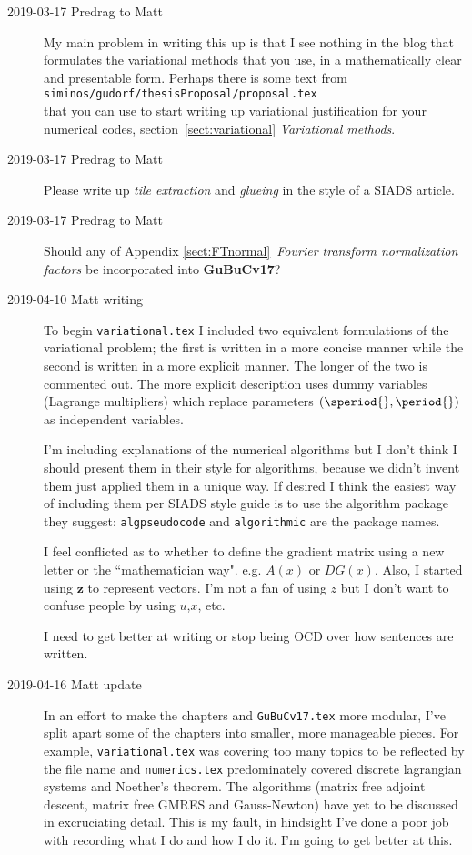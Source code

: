 \begin{description}

\item[2019-03-17 Predrag to Matt]
My main problem in writing this up is that I see nothing in
the blog that formulates the variational methods that you use,
in a mathematically clear and presentable form.
Perhaps there is some text from\\
\texttt{siminos/gudorf/thesisProposal/proposal.tex}\\
that you can use to start writing up variational justification for
your numerical codes, section~\ref{sect:variational} {\em Variational methods}.

\item[2019-03-17 Predrag to Matt]
Please write up {\em tile extraction} and {\em glueing} in the style of a
SIADS article.


\item[2019-03-17 Predrag to Matt]
Should any of
Appendix \ref{sect:FTnormal}~{\em Fourier transform normalization factors}
be incorporated into {\bf GuBuCv17}?

\item[2019-04-10 Matt writing]
To begin \texttt{variational.tex} I included two equivalent formulations
of the variational problem; the first is written in a more concise manner
while the second is written in a more explicit manner. The longer of the
two is commented out. The more explicit description uses dummy variables
(Lagrange multipliers) which replace parameters $(\speriod{},\period{})$
as independent variables.

I'm including explanations of the numerical algorithms but I don't think
I should present them in their style for algorithms, because we didn't
invent them just applied them in a unique way. If desired I think the
easiest way of including them per SIADS style guide is to use the
algorithm package they suggest: \texttt{algpseudocode} and
\texttt{algorithmic} are the package names.

I feel conflicted as to whether to define the gradient matrix using a new
letter or the ``mathematician way". e.g. $A(x)$ or $DG(x)$. Also, I
started using $\mathbf{z}$ to represent {\statesp} vectors. I'm not a fan
of using $z$ but I don't want to confuse people by using $u$,$x$, etc.

I need to get better at writing or stop being OCD over how sentences are written.

\item[2019-04-16 Matt update]
In an effort to make the chapters and \texttt{GuBuCv17.tex} more modular,
I've split apart some of the chapters into smaller, more manageable pieces.
For example, \texttt{variational.tex} was covering too many topics to be
reflected by the file name and \texttt{numerics.tex} predominately covered discrete
lagrangian systems and Noether's theorem. The algorithms (matrix free adjoint descent,
matrix free GMRES and Gauss-Newton) have yet to be discussed in excruciating detail.
This is my fault, in hindsight I've done a poor job with recording what I do and
how I do it. I'm going to get better at this.


\end{description}
